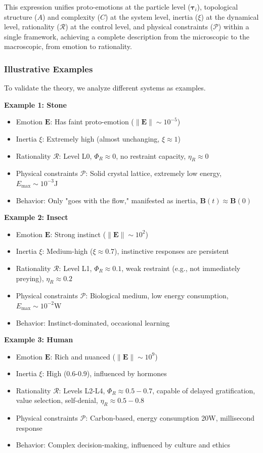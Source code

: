 \documentclass[12pt,a4paper]{article}
\theoremstyle{plain}
\newcommand{\ve}[1]{\bm{#1}}                    %
\newcommand{\Evec}{\ve{E}}                        %
\newcommand{\Bvec}{\ve{B}}                        %
\begin{document}
This expression unifies proto-emotions at the particle level ($\ve{\tau}_i$), topological structure ($A$) and complexity ($C$) at the system level, inertia ($\xi$) at the dynamical level, rationality ($\mathcal{R}$) at the control level, and physical constraints ($\mathcal{P}$) within a single framework, achieving a complete description from the microscopic to the macroscopic, from emotion to rationality.

\subsubsection{Illustrative Examples}

To validate the theory, we analyze different systems as examples.

\textbf{Example 1: Stone}
\begin{itemize}
    \item Emotion $\Evec$: Has faint proto-emotion ($\|\Evec\| \sim 10^{-5}$)
    \item Inertia $\xi$: Extremely high (almost unchanging, $\xi \approx 1$)
    \item Rationality $\mathcal{R}$: Level L0, $\Phi_R \approx 0$, no restraint capacity, $\eta_R \approx 0$
    \item Physical constraints $\mathcal{P}$: Solid crystal lattice, extremely low energy, $E_{\text{max}} \sim 10^{-3}$J
    \item Behavior: Only "goes with the flow," manifested as inertia, $\Bvec(t) \approx \Bvec(0)$
\end{itemize}

\textbf{Example 2: Insect}
\begin{itemize}
    \item Emotion $\Evec$: Strong instinct ($\|\Evec\| \sim 10^2$)
    \item Inertia $\xi$: Medium-high ($\xi \approx 0.7$), instinctive responses are persistent
    \item Rationality $\mathcal{R}$: Level L1, $\Phi_R \approx 0.1$, weak restraint (e.g., not immediately preying), $\eta_R \approx 0.2$
    \item Physical constraints $\mathcal{P}$: Biological medium, low energy consumption, $E_{\text{max}} \sim 10^{-2}$W
    \item Behavior: Instinct-dominated, occasional learning
\end{itemize}

\textbf{Example 3: Human}
\begin{itemize}
    \item Emotion $\Evec$: Rich and nuanced ($\|\Evec\| \sim 10^9$)
    \item Inertia $\xi$: High (0.6-0.9), influenced by hormones
    \item Rationality $\mathcal{R}$: Levels L2-L4, $\Phi_R \approx 0.5-0.7$, capable of delayed gratification, value selection, self-denial, $\eta_R \approx 0.5-0.8$
    \item Physical constraints $\mathcal{P}$: Carbon-based, energy consumption 20W, millisecond response
    \item Behavior: Complex decision-making, influenced by culture and ethics
\end{itemize}
\end{document}
